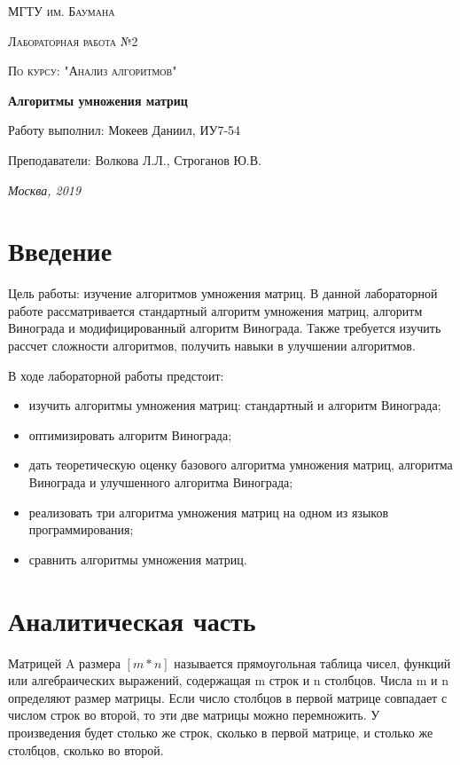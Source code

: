 \documentclass[12pt]{report}
\begin{document}
\begin{titlepage}
	\centering
	{\scshape\LARGE МГТУ им. Баумана \par}
	\vspace{3cm}
	{\scshape\Large Лабораторная работа №2\par}
	\vspace{0.5cm}	
	{\scshape\Large По курсу: "Анализ алгоритмов"\par}
	\vspace{1.5cm}
	{\huge\bfseries Алгоритмы умножения матриц\par}
	\vspace{2cm}
	\Large Работу выполнил: Мокеев Даниил, ИУ7-54\par
	\vspace{0.5cm}
	\Large Преподаватели:  Волкова Л.Л., Строганов Ю.В.\par

	\vfill
	\large \textit {Москва, 2019} \par
\end{titlepage}

\tableofcontents

\newpage
\chapter*{Введение}

Цель работы: изучение алгоритмов умножения матриц. В данной лабораторной работе рассматривается стандартный алгоритм умножения матриц, алгоритм Винограда и модифицированный алгоритм Винограда.  Также требуется изучить рассчет сложности алгоритмов, получить навыки в улучшении алгоритмов.

В ходе лабораторной работы предстоит:
\begin{itemize}
	\item изучить алгоритмы умножения матриц: стандартный и алгоритм Винограда; 
	\item оптимизировать алгоритм Винограда; 
	\item дать теоретическую оценку базового алгоритма умножения матриц, алгоритма Винограда и улучшенного алгоритма Винограда;
	\item реализовать три алгоритма умножения матриц на одном из языков программирования;  
	\item сравнить алгоритмы умножения матриц.
\end{itemize}

\chapter{Аналитическая часть}
Матрицей A размера $[m*n]$ называется прямоугольная таблица
чисел, функций или алгебраических выражений, содержащая m строк и n столбцов. Числа m и n определяют размер матрицы.\cite{Beloysov} Если число столбцов в первой матрице совпадает с числом строк во второй, то эти две матрицы можно перемножить. У произведения будет столько же строк, сколько в первой матрице, и столько же столбцов, сколько во второй.
\end{document}
